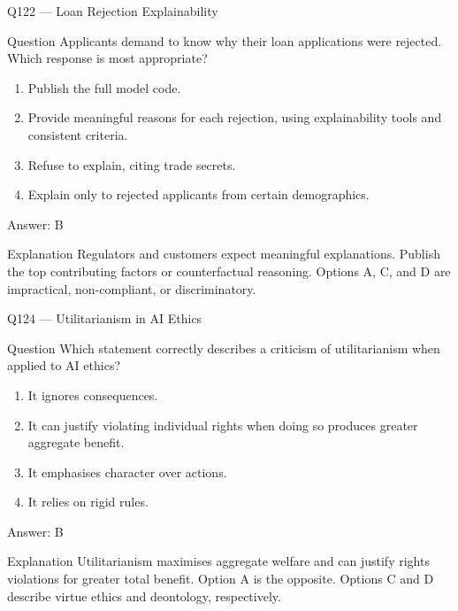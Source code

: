 \documentclass[aspectratio=169,8pt]{beamer}
\begin{document}
\begin{frame}{Q122 --- Loan Rejection Explainability}
	
	\begin{block}{Question}
		Applicants demand to know why their loan applications were rejected. Which response is most appropriate?
		
		\begin{enumerate}
			\item Publish the full model code.
			\item Provide meaningful reasons for each rejection, using explainability tools and consistent criteria.
			\item Refuse to explain, citing trade secrets.
			\item Explain only to rejected applicants from certain demographics.
		\end{enumerate}
	\end{block}
	
	\begin{exampleblock}{Answer: B}
	\end{exampleblock}
	
	\begin{block}{Explanation}
		Regulators and customers expect meaningful explanations. Publish the top contributing factors or counterfactual reasoning. Options A, C, and D are impractical, non-compliant, or discriminatory.
	\end{block}
	
\end{frame}





\begin{frame}{Q124 --- Utilitarianism in AI Ethics}
\begin{block}{Question}
Which statement correctly describes a criticism of utilitarianism when applied to AI ethics?
\begin{enumerate}
\item It ignores consequences.
\item It can justify violating individual rights when doing so produces greater aggregate benefit.
\item It emphasises character over actions.
\item It relies on rigid rules.
\end{enumerate}
	\end{block}
\begin{exampleblock}{Answer: B}\end{exampleblock}
\begin{block}{Explanation}
Utilitarianism maximises aggregate welfare and can justify rights violations for greater total benefit. Option A is the opposite. Options C and D describe virtue ethics and deontology, respectively.
\end{block}
\end{frame}
\end{document}
